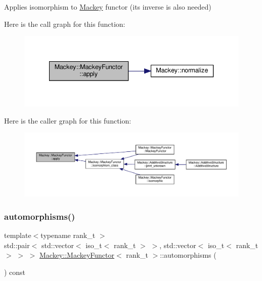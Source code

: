 Applies isomorphism to \hyperlink{namespaceMackey}{Mackey} functor (its inverse is also needed) 

Here is the call graph for this function\+:\nopagebreak
\begin{figure}[H]
\begin{center}
\leavevmode
\includegraphics[width=340pt]{classMackey_1_1MackeyFunctor_a6522cfe1071ccb92ff3db38d89e14687_cgraph}
\end{center}
\end{figure}
Here is the caller graph for this function\+:\nopagebreak
\begin{figure}[H]
\begin{center}
\leavevmode
\includegraphics[width=350pt]{classMackey_1_1MackeyFunctor_a6522cfe1071ccb92ff3db38d89e14687_icgraph}
\end{center}
\end{figure}
\mbox{\label{classMackey_1_1MackeyFunctor_ac7ef9ab9f3a13660a03c35e64dddd66b}} 
\subsubsection{\texorpdfstring{automorphisms()}{automorphisms()}}
{\footnotesize\ttfamily template$<$typename rank\+\_\+t $>$ \\
std\+::pair$<$ std\+::vector$<$ iso\+\_\+t$<$ rank\+\_\+t $>$ $>$, std\+::vector$<$ iso\+\_\+t$<$ rank\+\_\+t $>$ $>$ $>$ \hyperlink{classMackey_1_1MackeyFunctor}{Mackey\+::\+Mackey\+Functor}$<$ rank\+\_\+t $>$\+::automorphisms (\begin{DoxyParamCaption}{ }\end{DoxyParamCaption}) const}




